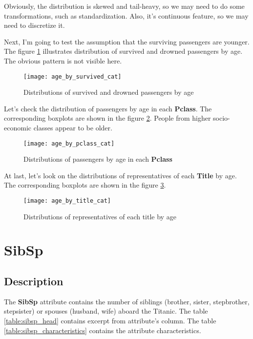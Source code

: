 Obviously, the distribution is skewed and tail-heavy, so we may need to 
do some transformations, such as standardization. Also, it's continuous 
feature, so we may need to discretize it.

Next, I'm going to test the assumption that the surviving passengers are 
younger. The figure \ref{pic:age_by_survived_cat} illustrates distribution 
of survived and drowned passengers by age. The obvious pattern is not 
visible here.

\begin{figure}[!hp]
    \centering
    \texttt{[image: age\_by\_survived\_cat]}
    \caption{Distributions of survived and drowned passengers by age}
    \label{pic:age_by_survived_cat}
\end{figure}

Let's check the distribution of passengers by age in each \textbf{Pclass}.
The corresponding boxplots are shown in the figure \ref{pic:age_by_pclass_cat}.
People from higher socio-economic classes appear to be older.

\begin{figure}[!hp]
    \centering
    \texttt{[image: age\_by\_pclass\_cat]}
    \caption{Distributions of passengers by age in each \textbf{Pclass}}
    \label{pic:age_by_pclass_cat}
\end{figure}

At last, let's look on the distributions of representatives of each 
\textbf{Title} by age. The corresponding boxplots are shown in the figure 
\ref{pic:age_by_title_cat}.

\begin{figure}[!hp]
    \centering
    \texttt{[image: age\_by\_title\_cat]}
    \caption{Distributions of representatives of each title by age}
    \label{pic:age_by_title_cat}
\end{figure}


\section{SibSp} \label{section:SibSp}
\subsection{Description}
The \textbf{SibSp} attribute contains the number of siblings (brother, 
sister, stepbrother, stepsister) or spouses (husband, wife) aboard the 
Titanic. The table \ref{table:sibsp_head} contains excerpt from 
attribute's column. The table \ref{table:sibsp_characteristics} contains
the attribute characteristics.

